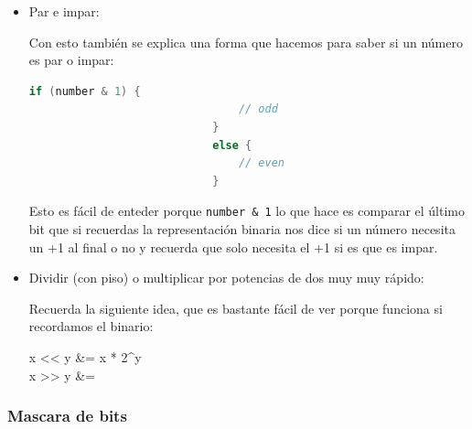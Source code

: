 \documentclass[12pt, fleqn]{report}                             %
\def \Eq {equation}                                             %
\newenvironment{MultiLineEquation*}[1]                          %
        {\begin{\Eq*}\begin{alignedat}{#1}}                         %
        {\end{alignedat}\end{\Eq*}}                                 %
\newenvironment{largeEq} {\begingroup \large}{\endgroup}        %
\theoremstyle{break}                                            %
\newcommand{\textCode}[1]  { \texttt{#1} }                      %
\begin{document}
                \begin{itemize}
                    \item Par e impar:
                    
                        Con esto también se explica una forma que hacemos para saber si un número es 
                        par o impar:
                        \begin{lstlisting}[language=C++, gobble=28]
                            if (number & 1) {
                                // odd
                            }
                            else {
                                // even
                            }
                        \end{lstlisting}

                        Esto es fácil de enteder porque \textCode{number \& 1} lo que hace es comparar el último bit
                        que si recuerdas la representación binaria nos dice si un número necesita un +1 al final 
                        o no y recuerda que solo necesita el +1 si es que es impar.

                    \item Dividir (con piso) o multiplicar por potencias de dos muy muy rápido:
                    
                        Recuerda la siguiente idea, que es bastante fácil de ver porque funciona
                        si recordamos el binario:
                        \begin{largeEq}
                            \begin{MultiLineEquation*}{3}
                                x << y &= x * 2^y                                           \\
                                x >> y &= \left \lfloor {} \right \rfloor 
                            \end{MultiLineEquation*}
                        \end{largeEq}
                \end{itemize}

            \subsubsection{Mascara de bits}
\end{document}
